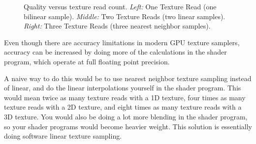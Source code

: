 \documentclass{jcgt}
\begin{document}
  \begin{figure}
    \caption{ Quality versus texture read count. \textit{Left:} One Texture Read (one bilinear sample). \textit{Middle:} Two Texture Reads (two linear samples). \textit{Right:} Three Texture Reads (three nearest neighbor samples).}   
    \label{fig:samplehwsw}
  \end{figure} 

Even though there are accuracy limitations in modern GPU texture samplers, accuracy can be increased by doing more of the calculations in the shader program, which operate at full floating point precision.

A naive way to do this would be to use nearest neighbor texture sampling instead of linear, and do the linear interpolations yourself in the shader program.  This would mean twice as many texture reads with a 1D texture, four times as many texture reads with a 2D texture, and eight times as many texture reads with a 3D texture.  You would also be doing a lot more blending in the shader program, so your shader programs would become heavier weight.  This solution is essentially doing software linear texture sampling.
\end{document}
